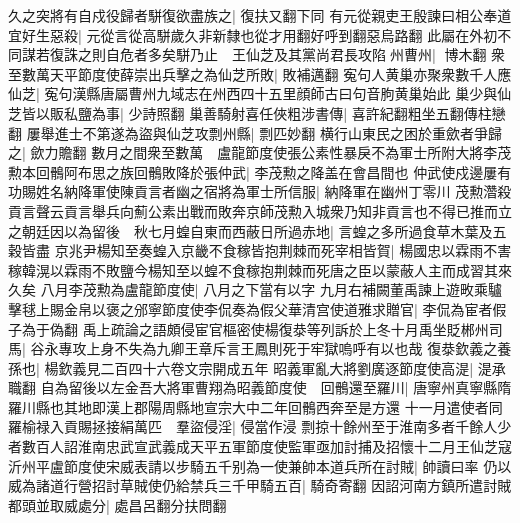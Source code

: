 久之突將有自戍役歸者駢復欲盡族之|{
	復扶又翻下同}
有元從親吏王殷諫曰相公奉道宜好生惡殺|{
	元從言從高駢歲久非新隸也從才用翻好呼到翻惡烏路翻}
此屬在外初不同謀若復誅之則自危者多矣駢乃止　王仙芝及其黨尚君長攻陷州曹州|{
	博木翻}
衆至數萬天平節度使薛崇出兵擊之為仙芝所敗|{
	敗補邁翻}
寃句人黄巢亦聚衆數千人應仙芝|{
	寃句漢縣唐屬曹州九域志在州西四十五里顔師古曰句音胊黄巢始此}
巢少與仙芝皆以販私鹽為事|{
	少詩照翻}
巢善騎射喜任俠粗涉書傳|{
	喜許紀翻粗坐五翻傳柱戀翻}
屢舉進士不第遂為盜與仙芝攻剽州縣|{
	剽匹妙翻}
横行山東民之困於重歛者爭歸之|{
	歛力贍翻}
數月之間衆至數萬　盧龍節度使張公素性暴戾不為軍士所附大將李茂勲本回鶻阿布思之族回鶻敗降於張仲武|{
	李茂勲之降盖在會昌間也}
仲武使戍邊屢有功賜姓名納降軍使陳貢言者幽之宿將為軍士所信服|{
	納降軍在幽州丁零川}
茂勲濳殺貢言聲云貢言舉兵向薊公素出戰而敗奔京師茂勲入城衆乃知非貢言也不得已推而立之朝廷因以為留後　秋七月蝗自東而西蔽日所過赤地|{
	言蝗之多所過食草木葉及五穀皆盡}
京兆尹楊知至奏蝗入京畿不食稼皆抱荆棘而死宰相皆賀|{
	楊國忠以霖雨不害稼韓滉以霖雨不敗鹽今楊知至以蝗不食稼抱荆棘而死唐之臣以蒙蔽人主而成習其來久矣}
八月李茂勲為盧龍節度使|{
	八月之下當有以字}
九月右補闕董禹諫上遊畋乘驢擊毬上賜金帛以褒之邠寧節度使李侃奏為假父華清宫使道雅求贈官|{
	李侃為宦者假子為于偽翻}
禹上疏論之語頗侵宦官樞密使楊復㳟等列訴於上冬十月禹坐貶郴州司馬|{
	谷永專攻上身不失為九卿王章斥言王鳳則死于牢獄嗚呼有以也哉}
復㳟欽義之養孫也|{
	楊欽義見二百四十六卷文宗開成五年}
昭義軍亂大將劉廣逐節度使高湜|{
	湜承職翻}
自為留後以左金吾大將軍曹翔為昭義節度使　回鶻還至羅川|{
	唐寧州真寧縣隋羅川縣也其地即漢上郡陽周縣地宣宗大中二年回鶻西奔至是方還}
十一月遣使者同羅榆禄入貢賜拯接絹萬匹　羣盜侵淫|{
	侵當作浸}
剽掠十餘州至于淮南多者千餘人少者數百人詔淮南忠武宣武義成天平五軍節度使監軍亟加討捕及招懷十二月王仙芝寇沂州平盧節度使宋威表請以步騎五千别為一使兼帥本道兵所在討賊|{
	帥讀曰率}
仍以威為諸道行營招討草賊使仍給禁兵三千甲騎五百|{
	騎奇寄翻}
因詔河南方鎮所遣討賊都頭並取威處分|{
	處昌呂翻分扶問翻}



